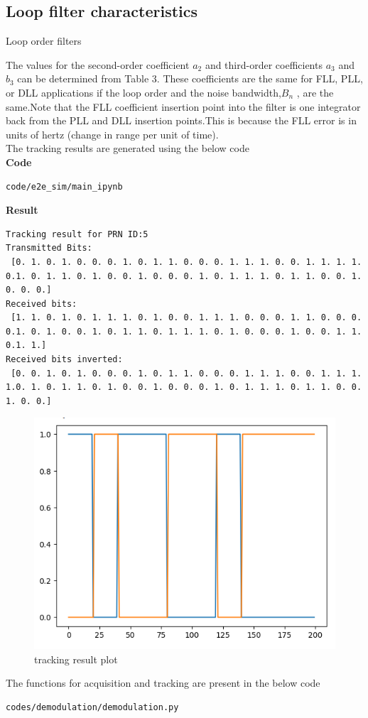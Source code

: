 \subsection{Loop filter characteristics}
\begin{table}[h]
\centering
	\caption{\Large{Loop order filters }}
	
\end{table}

The values for the second-order coefficient $a_2$ and third-order coefficients $a_3$ and $b_3$ can be determined from Table 3. These coefficients are the same for FLL, PLL, or DLL applications if the loop
order and the noise bandwidth,$B_n$ , are the same.Note that the FLL coefficient insertion point into the filter is one integrator back from the PLL and DLL insertion points.This is because the FLL error is in units of hertz (change in range per unit of time).\\
The tracking results are generated using the below code\\
\textbf{Code}
\begin{lstlisting}
code/e2e_sim/main_ipynb
\end{lstlisting}
\textbf{Result}
\begin{lstlisting}
Tracking result for PRN ID:5
Transmitted Bits:
 [0. 1. 0. 1. 0. 0. 0. 1. 0. 1. 1. 0. 0. 0. 1. 1. 1. 0. 0. 1. 1. 1. 1. 0.1. 0. 1. 1. 0. 1. 0. 0. 1. 0. 0. 0. 1. 0. 1. 1. 1. 0. 1. 1. 0. 0. 1. 0. 0. 0.]
Received bits:
 [1. 1. 0. 1. 0. 1. 1. 1. 0. 1. 0. 0. 1. 1. 1. 0. 0. 0. 1. 1. 0. 0. 0. 0.1. 0. 1. 0. 0. 1. 0. 1. 1. 0. 1. 1. 1. 0. 1. 0. 0. 0. 1. 0. 0. 1. 1. 0.1. 1.]
Received bits inverted:
 [0. 0. 1. 0. 1. 0. 0. 0. 1. 0. 1. 1. 0. 0. 0. 1. 1. 1. 0. 0. 1. 1. 1. 1.0. 1. 0. 1. 1. 0. 1. 0. 0. 1. 0. 0. 0. 1. 0. 1. 1. 1. 0. 1. 1. 0. 0. 1. 0. 0.]
\end{lstlisting}

\begin{figure}[H]
\includegraphics[width=0.5\columnwidth]{figs/tracking_plot.png}
\caption{tracking result plot}
\end{figure}

The functions for acquisition and tracking are present in the below code
\begin{lstlisting}
codes/demodulation/demodulation.py
\end{lstlisting}



%
